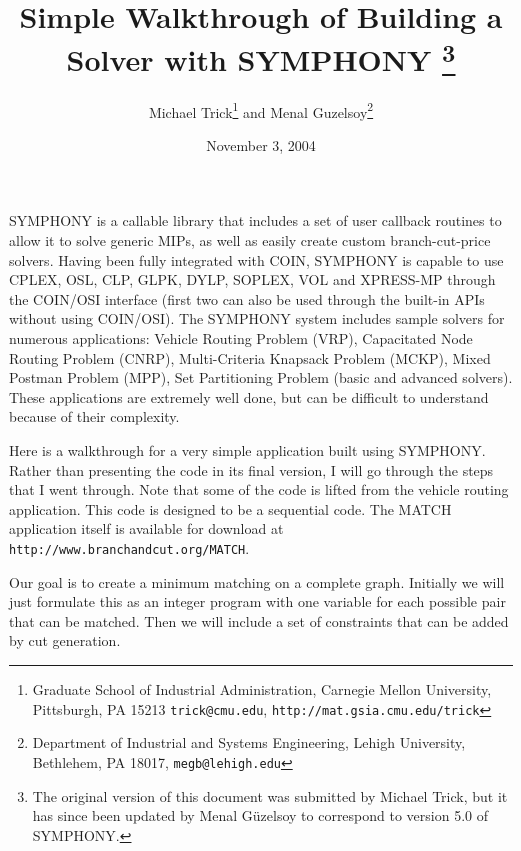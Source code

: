 \documentclass[11pt]{article}
\begin{document}
\title{Simple Walkthrough of Building a Solver with SYMPHONY \thanks{The
original version of this document was submitted by Michael Trick, but it has
since been updated by Menal G\"uzelsoy to correspond to version 5.0 of
SYMPHONY.}}

\author{Michael Trick\thanks{Graduate School of Industrial Administration,
Carnegie Mellon University, Pittsburgh, PA 15213 \texttt{trick@cmu.edu},
\texttt{http://mat.gsia.cmu.edu/trick}} and Menal Guzelsoy\thanks{Department
of Industrial and Systems Engineering, Lehigh University, Bethlehem, PA 18017,
{\tt megb@lehigh.edu}}}

\date{November 3, 2004}
\maketitle
\thispagestyle{empty}

SYMPHONY is a callable library that includes a set of user callback routines
to allow it to solve generic MIPs, as well as easily create custom
branch-cut-price solvers. Having been fully integrated with COIN, SYMPHONY is
capable to use CPLEX, OSL, CLP, GLPK, DYLP, SOPLEX, VOL and XPRESS-MP through
the COIN/OSI interface (first two can also be used through the built-in APIs
without using COIN/OSI). The SYMPHONY system includes sample solvers for
numerous applications: Vehicle Routing Problem (VRP), Capacitated Node Routing
Problem (CNRP), Multi-Criteria Knapsack Problem (MCKP), Mixed Postman Problem
(MPP), Set Partitioning Problem (basic and advanced solvers).  These
applications are extremely well done, but can be difficult to
understand because of their complexity.

Here is a walkthrough for a very simple application built using
SYMPHONY. Rather than presenting the code in its final version, I will go
through the steps that I went through. Note that some of the code is lifted
from the vehicle routing application. This code is designed to be a sequential
code. The MATCH application itself is available for download at
\texttt{http://www.branchandcut.org/MATCH}.

Our goal is to create a minimum matching on a complete graph.  Initially we
will just formulate this as an integer program with one variable for each
possible pair that can be matched. Then we will include a set of constraints
that can be added by cut generation.
\end{document}
